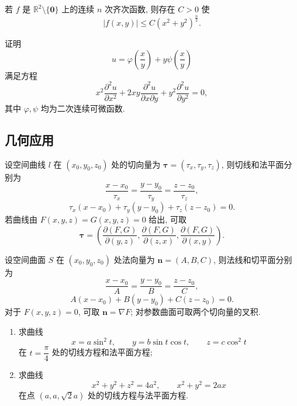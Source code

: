 \documentclass[../数学分析培优讲义.tex]{subfiles}
\begin{document}
\begin{proposition}
若 $f$ 是 $\mathbb{R}^2\setminus\{\bm{0}\}$ 上的连续 $n$ 次齐次函数, 则存在 $C>0$ 使
\[
    |f(x,y)|\leq C(x^2+y^2)^{\frac{n}{2}}.
\]
\end{proposition}

\begin{example}
证明
\[
    u=\varphi\left(\dfrac{x}{y}\right)+y\psi\left(\dfrac{x}{y}\right)
\]
满足方程
\[
    x^2\dfrac{\partial^2u}{\partial x^2}
    +2xy\dfrac{\partial^2u}{\partial x\partial y}
    +y^2\dfrac{\partial^2u}{\partial y^2}=0,
\]
其中 $\varphi,\psi$ 均为二次连续可微函数.
\end{example}
\exampleblank


\newpage

\subsection{几何应用}

\begin{proposition}[\markstar]
设空间曲线 $l$ 在 $(x_0,y_0,z_0)$ 处的切向量为 $\bm\tau=(\tau_x,\tau_y,\tau_z)$, 则切线和法平面分别为
\[
    \dfrac{x-x_0}{\tau_x}=\dfrac{y-y_0}{\tau_y}=\dfrac{z-z_0}{\tau_z},
\]
\[
    \tau_x(x-x_0)+\tau_y(y-y_0)+\tau_z(z-z_0)=0.
\]
若曲线由 $F(x,y,z)=G(x,y,z)=0$ 给出, 可取
\[
    \bm\tau=
    \left(
    \dfrac{\partial(F,G)}{\partial(y,z)},
    \dfrac{\partial(F,G)}{\partial(z,x)},
    \dfrac{\partial(F,G)}{\partial(x,y)}
    \right).
\]
\end{proposition}

\begin{proposition}[\markstar]
设空间曲面 $S$ 在 $(x_0,y_0,z_0)$ 处法向量为 $\bm n=(A,B,C)$, 则法线和切平面分别为
\[
    \dfrac{x-x_0}{A}=\dfrac{y-y_0}{B}=\dfrac{z-z_0}{C},
\]
\[
    A(x-x_0)+B(y-y_0)+C(z-z_0)=0.
\]
对于 $F(x,y,z)=0$, 可取 $\bm n=\nabla F$; 对参数曲面可取两个切向量的叉积.
\end{proposition}

\begin{example}
\begin{enumerate}[label=(\arabic*)]
    \item 求曲线
    \[
        x=a\sin^2t,\qquad y=b\sin t\cos t,\qquad z=c\cos^2t
    \]
    在 $t=\dfrac{\pi}{4}$ 处的切线方程和法平面方程;
    \item 求曲线
    \[
        x^2+y^2+z^2=4a^2,\qquad x^2+y^2=2ax
    \]
    在点 $(a,a,\sqrt2a)$ 处的切线方程与法平面方程.
\end{enumerate}
\end{example}
\exampleblank
\end{document}
